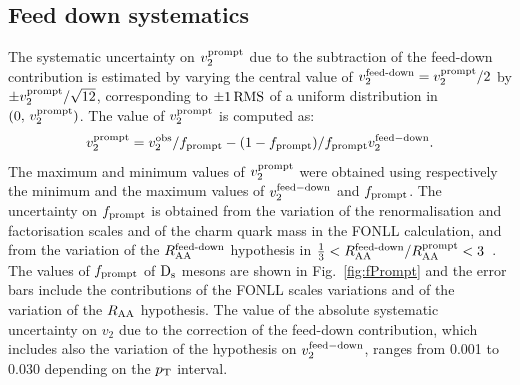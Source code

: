 \subsection{Feed down systematics}
\label{FDsystV2}
The systematic uncertainty on $v_{2}^{\rm prompt}$ due to the subtraction of the feed-down contribution 
is estimated by varying the central value of 
$v_{2}^{\rm feed\textnormal{-}down}=v_{2}^{\rm prompt}/2$ by $ \pm v_{2}^{\rm prompt}/\sqrt{12}$, corresponding to 
$\rm \pm 1\,RMS$ of a uniform distribution in $(0,\,v_{2}^{\rm prompt})$.
The value of $v_2^{\rm prompt}$ is computed as:
\begin{equation}
v_{2}^{\rm prompt}=v_{2}^{\rm obs}/f_{\rm prompt} - (1-f_{\rm prompt})/f_{\rm prompt}v_{2}^{\rm feed-down}.
\end{equation} 
The maximum and minimum values of $v_2^{\rm prompt}$ were
obtained using respectively the minimum and the maximum values 
of $v_{\rm 2}^{\rm feed-down}$ and $f_{\rm prompt}$. 
The uncertainty on $f_{\rm prompt}$ is obtained from the
variation of the renormalisation and factorisation scales and of the charm quark
mass in the FONLL calculation, and from the variation of the 
$R_{\rm AA}^{\rm feed\textnormal{-}down}$ hypothesis in  
$\frac{1}{3}< R_{\rm AA}^{\rm feed\textnormal{-}down}/R_{\rm AA}^{\rm prompt}<3$~\cite{Adam:2015jda}. 
The values of $f_{\rm prompt}$ of ${\rm D_s}$ mesons
are shown in Fig.~\ref{fig:fPrompt} and the error bars include the
contributions of the FONLL scales variations and of the variation of
the $R_{\rm AA}$ hypothesis. The value of the absolute systematic uncertainty on $v_2$
due to the correction of the feed-down contribution, which includes also the variation
of the hypothesis on $v_{\rm 2}^{\rm feed-down}$, ranges from 0.001 to 0.030 depending on the $p_{\rm T}$ interval.
